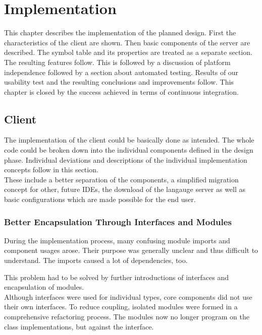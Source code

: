 \section{Implementation}
This chapter describes the implementation of the planned design.
First the characteristics of the client are shown.
Then basic components of the server are described.
The symbol table and its properties are treated as a separate section.
The resulting features follow.
This is followed by a discussion of platform independence followed by a section about automated testing.
Results of our usability test and the resulting conclusions and improvements follow.
This chapter is closed by the success achieved in terms of continuous integration.

\subsection{Client}
The implementation of the client could be basically done as intended.
The whole code could be broken down into the individual components defined in the design phase.
Individual deviations and descriptions of the individual implementation concepts follow in this section. \\

These include a better separation of the components,
a simplified migration concept for other, future IDEs,
the download of the langauge server
as well as basic configurations which are made possible for the end user.

\subsubsection{Better Encapsulation Through Interfaces and Modules}
\label{section:implementation:client:module_encapsulation}

During the implementation process, many confusing module imports and component usages arose.
Their purpose was generally unclear and thus difficult to understand.
The imports caused a lot of dependencies, too.

This problem had to be solved by further introductions of interfaces and encapsulation of modules. \\

Although interfaces were used for individual types,
core components did not use their own interfaces.
To reduce coupling, isolated modules were formed in a comprehensive refactoring process.
The modules now no longer program on the class implementations, but against the interface. \\

